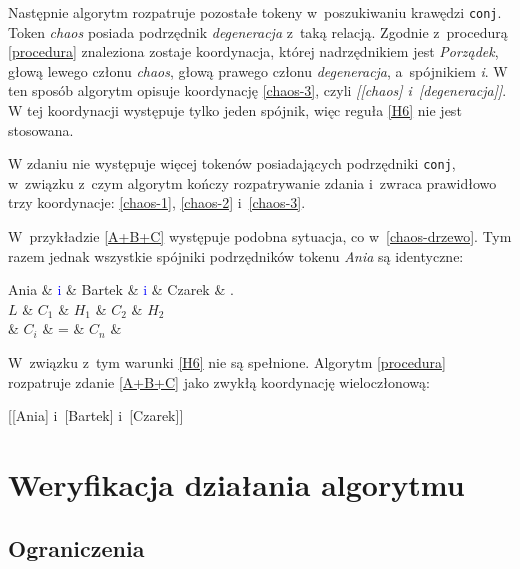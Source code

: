 Następnie algorytm rozpatruje pozostałe tokeny w~poszukiwaniu krawędzi \texttt{conj}. Token \textit{chaos} posiada podrzędnik \textit{degeneracja} z~taką relacją. Zgodnie z~procedurą \eqref{procedura} znaleziona zostaje koordynacja, której nadrzędnikiem jest \textit{Porządek}, głową lewego członu \textit{chaos}, głową prawego członu \textit{degeneracja}, a~spójnikiem \textit{i}. W ten sposób algorytm opisuje koordynację \eqref{chaos-3}, czyli \textit{[[chaos] i~[degeneracja]]}. W tej koordynacji występuje tylko jeden spójnik, więc reguła \ref{H6} nie jest stosowana.

W zdaniu nie występuje więcej tokenów posiadających podrzędniki \texttt{conj}, w~związku z~czym algorytm kończy rozpatrywanie zdania i~zwraca prawidłowo trzy koordynacje: \eqref{chaos-1}, \eqref{chaos-2} i~\eqref{chaos-3}.

W~przykładzie \eqref{A+B+C} występuje podobna sytuacja, co w~\eqref{chaos-drzewo}. Tym razem jednak wszystkie spójniki podrzędników tokenu \emph{Ania} są identyczne:

\begin{exe}
\ex \label{A+B+C}
\begin{dependency}[baseline=2.9ex]
\begin{deptext}[column sep=1em, row sep=.3ex]
Ania \& \textcolor{blue}{i} \& Bartek \& \textcolor{blue}{i} \& Czarek \& .  \\ 
$L$ \& $C_{1}$ \& $H_{1}$ \& $C_{2}$ \& $H_{2}$ \\
 \& $C_{i}$ \& = \& $C_{n}$ \& \\
\end{deptext}
\end{dependency}
\end{exe}

W~związku z~tym warunki \ref{H6} nie są spełnione. Algorytm \eqref{procedura} rozpatruje zdanie \eqref{A+B+C} jako zwykłą koordynację wieloczłonową:

\begin{exe}
\ex \label{A+B+C-koordynacja}
{[[Ania] i~[Bartek] i~[Czarek]]}
\end{exe}

\section{Weryfikacja działania algorytmu}

\subsection{Ograniczenia}

